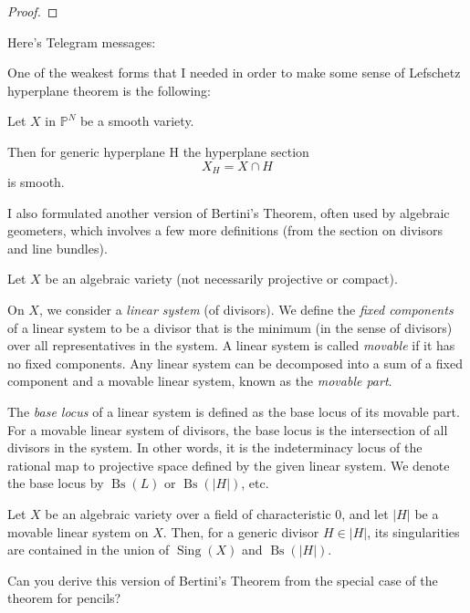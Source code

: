 \begin{proof}\leavevmode

\end{proof}

Here's Telegram messages:

One of the weakest forms that I needed in order to make some sense of Lefschetz hyperplane theorem is the following:

Let \(X\) in \(\mathbb{P}^N\) be a smooth variety.

Then for generic hyperplane H the hyperplane section
\[X_H=X \cap H\]
is smooth.

I also formulated another version of Bertini's Theorem, often used by algebraic geometers, which involves a few more definitions (from the section on divisors and line bundles).

Let \( X \) be an algebraic variety (not necessarily projective or compact).

On \( X \), we consider a \emph{linear system} (of divisors). We define the \emph{fixed components} of a linear system to be a divisor that is the minimum (in the sense of divisors) over all representatives in the system. A linear system is called \emph{movable} if it has no fixed components. Any linear system can be decomposed into a sum of a fixed component and a movable linear system, known as the \emph{movable part}.

The \emph{base locus} of a linear system is defined as the base locus of its movable part. For a movable linear system of divisors, the base locus is the intersection of all divisors in the system. In other words, it is the indeterminacy locus of the rational map to projective space defined by the given linear system. We denote the base locus by \( \operatorname{Bs}(L) \) or \( \operatorname{Bs}(|H|) \), etc.

\begin{thm}[Bertini]
Let \( X \) be an algebraic variety over a field of characteristic 0, and let \( |H| \) be a movable linear system on \( X \). Then, for a generic divisor \( H \in |H| \), its singularities are contained in the union of \( \operatorname{Sing}(X) \) and \( \operatorname{Bs}(|H|) \).
\end{thm}

\begin{exercise}
Can you derive this version of Bertini’s Theorem from the special case of the theorem for pencils?
\end{exercise}




